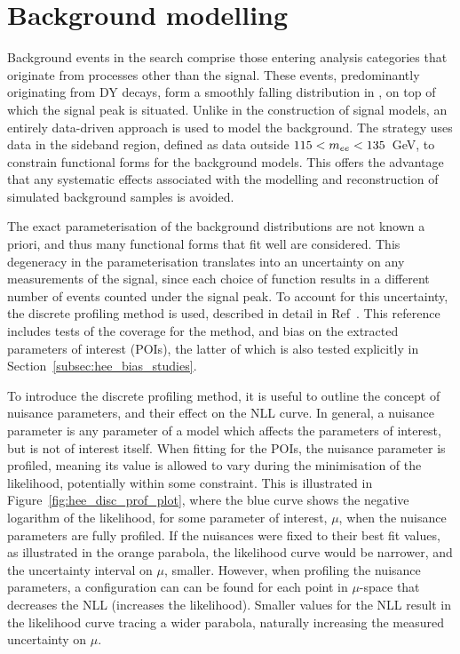 \section{Background modelling}
\label{subsec:hee_b_modelling}

Background events in the \Hee search comprise those entering analysis categories that originate from processes other than the \Hee signal. These events, predominantly originating from DY decays, form a smoothly falling distribution in \mee, on top of which the signal peak is situated. Unlike in the construction of signal models, an entirely data-driven approach is used to model the background. The strategy uses data in the sideband region, defined as data outside $115<m_{ee}<135$~GeV, to constrain functional forms for the background models. This offers the advantage that any systematic effects associated with the modelling and reconstruction of simulated background samples is avoided.

The exact parameterisation of the background distributions are not known a priori, and thus many functional forms that fit well are considered. This degeneracy in the parameterisation translates into an uncertainty on any measurements of the signal, since each choice of function results in a different number of events counted under the signal peak. To account for this uncertainty, the discrete profiling method is used, described in detail in Ref~\cite{envelope_method}. This reference includes tests of the coverage for the method, and bias on the extracted parameters of interest (POIs), the latter of which is also tested explicitly in Section~\ref{subsec:hee_bias_studies}.

To introduce the discrete profiling method, it is useful to outline the concept of nuisance parameters, and their effect on the NLL curve. In general, a nuisance parameter is any parameter of a model which affects the parameters of interest, but is not of interest itself. When fitting for the POIs, the nuisance parameter is profiled, meaning its value is allowed to vary during the minimisation of the likelihood, potentially within some constraint. This is illustrated in Figure~\ref{fig:hee_disc_prof_plot}, where the blue curve shows the negative logarithm of the likelihood, for some parameter of interest, $\mu$, when the nuisance parameters are fully profiled. 
If the nuisances were fixed to their best fit values, as illustrated in the orange parabola, the likelihood curve would be narrower, and the uncertainty interval on $\mu$, smaller.
However, when profiling the nuisance parameters, a configuration can can be found for each point in $\mu$-space that decreases the NLL (increases the likelihood). Smaller values for the NLL result in the likelihood curve tracing a wider parabola, naturally increasing the measured uncertainty on $\mu$.

